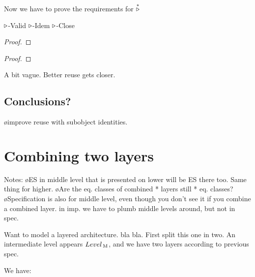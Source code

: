 Now we have to prove the requirements for $\stackrel{*}{\triangleright}$

						{$\triangleright$-Valid} 
				{$\triangleright$-Idem} 
	{$\triangleright$-Close} 



\begin{proof}
\prf{
}
\end{proof}


\begin{proof}
\prf{
}
\end{proof}


A bit vague. Better reuse gets closer.

\subsection{Conclusions?}

\bl
\o improve reuse with subobject identities.
\el





%																
%																
%																
\section{Combining two layers}  \label{sect:combinedExtra}


Notes:
\bl
\o ES in middle level that is presented on lower will be ES there too. Same thing for higher.
\o Are the eq. classes of combined * layers still * eq. classes?
\o Specification is also for middle level, even though you don't see it if you combine a  combined layer. in imp. we have to plumb middle levels around, but not in spec.
\el


Want to model a layered architecture. bla bla. First split this one in two. An intermediate level appears $Level_{\, \mathrm M}$, and we have two layers according to previous spec. 



We have: 


